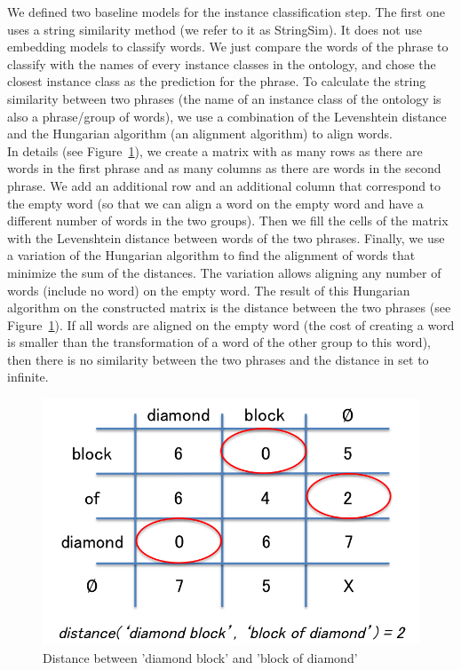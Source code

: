 \documentclass[twocolumn]{article}
\begin{document}
We defined two baseline models for the instance classification step.
The first one uses a string similarity method (we refer to it as StringSim). It does not use embedding models to classify words. We just compare the words of the phrase to classify with the names of every instance classes in the ontology, and chose the closest instance class as the prediction for the phrase. To calculate the string similarity between two phrases (the name of an instance class of the ontology is also a phrase/group of words), we use a combination of the Levenshtein distance and the Hungarian algorithm (an alignment algorithm) to align words.\\
In details (see Figure~\ref{distance}), we create a matrix with as many rows as there are words in the first phrase and as many columns as there are words in the second phrase. We add an additional row and an additional column that correspond to the empty word (so that we can align a word on the empty word and have a different number of words in the two groups). Then we fill the cells of the matrix with the Levenshtein distance between words of the two phrases. Finally, we use a variation of the Hungarian algorithm to find the alignment of words that minimize the sum of the distances. The variation allows aligning any number of words (include no word) on the empty word. The result of this Hungarian algorithm on the constructed matrix is the distance between the two phrases (see Figure~\ref{distance}). If all words are aligned on the empty word (the cost of creating a word is smaller than the transformation of a word of the other group to this word), then there is no similarity between the two phrases and the distance in set to infinite.

\begin{figure}[t]
   \centering \includegraphics[width=\linewidth]{Figures/Semantic_Parsing/distance.png}
   \caption{\label{distance} Distance between 'diamond block' and 'block of diamond'}
\end{figure}
\end{document}
